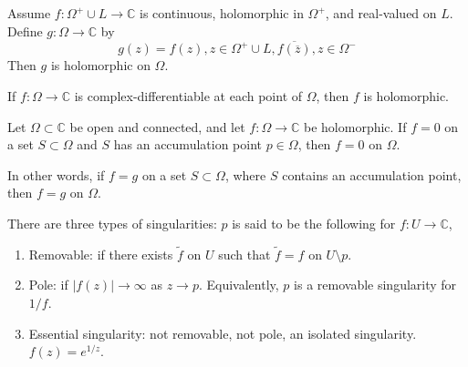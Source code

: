 \documentclass[openany]{book}
\newcommand{\C}{\mathbb{C}}
\begin{document}
\begin{thm}
    Assume $f:\Omega^+\cup L\to\C$ is continuous, holomorphic in $\Omega^+$, and real-valued on $L$. Define $g:\Omega\to\C$ by
    \begin{equation*}
        g(z)=f(z), z\in\Omega^+\cup L, \overline{f(\overline{z})}, z\in\Omega^-
    \end{equation*}
    Then $g$ is holomorphic on $\Omega$.
\end{thm}


\begin{thm}
    If $f:\Omega\to\C$ is complex-differentiable at each point of $\Omega$, then $f$ is holomorphic.
\end{thm}



\begin{prop}
    Let $\Omega \subset \mathbb{C}$ be open and connected, and let $f : \Omega \to \mathbb{C}$ be holomorphic. If $f = 0$ on a set $S \subset \Omega$ and $S$ has an accumulation point $p \in \Omega$, then $f = 0$ on $\Omega$.

    In other words, if $f=g$ on a set $S\subset\Omega$, where $S$ contains an accumulation point, then $f=g$ on $\Omega$.
\end{prop}





\begin{defn}[singularities]
    There are three types of singularities: $p$ is said to be the following for $f:U\to\C$,
    \begin{enumerate}
        \item Removable: if there exists $\tilde{f}$ on $U$ such that $\tilde{f}=f$ on $U\setminus p$.
        \item Pole: if $|f(z)|\to\infty$ as $z\to p$. Equivalently, $p$ is a removable singularity for $1/f$.
        \item Essential singularity: not removable, not pole, an isolated singularity. $f(z)=e^{1/z}$.
    \end{enumerate}
\end{defn}
\end{document}
